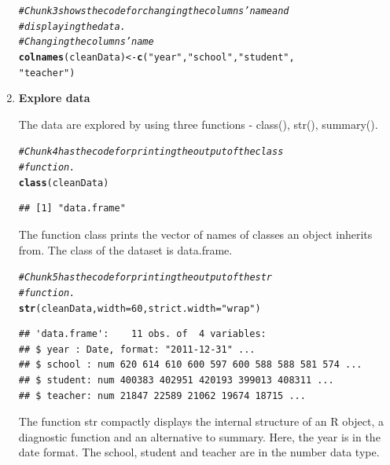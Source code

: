 \documentclass{article}\usepackage[]{graphicx}\usepackage[]{color}
\makeatletter
\newcommand{\hlnum}[1]{\textcolor[rgb]{0.686,0.059,0.569}{#1}}%
\newcommand{\hlstr}[1]{\textcolor[rgb]{0.192,0.494,0.8}{#1}}%
\newcommand{\hlcom}[1]{\textcolor[rgb]{0.678,0.584,0.686}{\textit{#1}}}%
\newcommand{\hlstd}[1]{\textcolor[rgb]{0.345,0.345,0.345}{#1}}%
\newcommand{\hlkwb}[1]{\textcolor[rgb]{0.69,0.353,0.396}{#1}}%
\newcommand{\hlkwc}[1]{\textcolor[rgb]{0.333,0.667,0.333}{#1}}%
\newcommand{\hlkwd}[1]{\textcolor[rgb]{0.737,0.353,0.396}{\textbf{#1}}}%
\newenvironment{kframe}{%
 \def\at@end@of@kframe{}%
 \ifinner\ifhmode%
  \def\at@end@of@kframe{\end{minipage}}%
  \begin{minipage}{\columnwidth}%
 \fi\fi%
 \def\FrameCommand##1{\hskip\@totalleftmargin \hskip-\fboxsep
 \colorbox{shadecolor}{##1}\hskip-\fboxsep
     \hskip-\linewidth \hskip-\@totalleftmargin \hskip\columnwidth}%
 \MakeFramed {\advance\hsize-\width
   \@totalleftmargin\z@ \linewidth\hsize
   \@setminipage}}%
 {\par\unskip\endMakeFramed%
 \at@end@of@kframe}
\newenvironment{knitrout}{}{} %
\makeatother
\begin{document}
\begin{enumerate}
\begin{knitrout}
\color{fgcolor}\begin{kframe}
\begin{alltt}
\hlcom{# Chunk3 shows the code for changing the columns' name and }
\hlcom{# displaying the data.}
\hlcom{# Changing the columns' name}
\hlkwd{colnames}\hlstd{(cleanData)} \hlkwb{<-} \hlkwd{c}\hlstd{(}\hlstr{"year"}\hlstd{,} \hlstr{"school"}\hlstd{,} \hlstr{"student"}\hlstd{,}
                         \hlstr{"teacher"}\hlstd{)}
\end{alltt}
\end{kframe}
\end{knitrout}
\item \textbf{Explore data}

The data are explored by using three functions - class(), str(), summary().

\begin{knitrout}
\color{fgcolor}\begin{kframe}
\begin{alltt}
\hlcom{# Chunk4 has the code for printing the output of the class }
\hlcom{# function.}
\hlkwd{class}\hlstd{(cleanData)}
\end{alltt}
\begin{verbatim}
## [1] "data.frame"
\end{verbatim}
\end{kframe}
\end{knitrout}
The function class prints the vector of names of classes an object inherits from. The class of the dataset is data.frame.

\begin{knitrout}
\color{fgcolor}\begin{kframe}
\begin{alltt}
\hlcom{# Chunk5 has the code for printing the output of the str }
\hlcom{# function.}
\hlkwd{str}\hlstd{(cleanData,} \hlkwc{width}\hlstd{=}\hlnum{60}\hlstd{,} \hlkwc{strict.width}\hlstd{=}\hlstr{"wrap"}\hlstd{)}
\end{alltt}
\begin{verbatim}
## 'data.frame':	11 obs. of  4 variables:
## $ year : Date, format: "2011-12-31" ...
## $ school : num 620 614 610 600 597 600 588 588 581 574 ...
## $ student: num 400383 402951 420193 399013 408311 ...
## $ teacher: num 21847 22589 21062 19674 18715 ...
\end{verbatim}
\end{kframe}
\end{knitrout}
The function str compactly displays the internal structure of an R object, a diagnostic function and an alternative to summary. Here, the year is in the date format. The school, student and teacher are in the number data type.


\end{enumerate}
\end{document}
